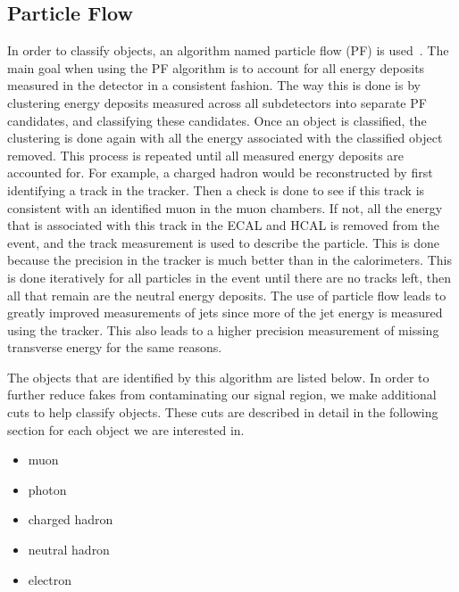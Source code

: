 \subsection{Particle Flow}
\label{subs:particleflow}
In order to classify objects, an algorithm named particle flow (PF) is used~\cite{pfReco}. 
The main goal when using the PF algorithm is to account for all energy deposits measured in the detector in a consistent fashion.
The way this is done is by clustering energy deposits measured across all subdetectors into separate PF candidates, and classifying these candidates.
Once an object is classified, the clustering is done again with all the energy associated with the classified object removed.
This process is repeated until all measured energy deposits are accounted for.
For example, a charged hadron would be reconstructed by first identifying a track in the tracker.
Then a check is done to see if this track is consistent with an identified muon in the muon chambers.
If not, all the energy that is associated with this track in the ECAL and HCAL is removed from the event,
and the track measurement is used to describe the particle.
This is done because the precision in the tracker is much better than in the calorimeters.
This is done iteratively for all particles in the event until there are no tracks left,
then all that remain are the neutral energy deposits.
The use of particle flow leads to greatly improved measurements of jets since more of the jet energy is measured using the tracker.
This also leads to a higher precision measurement of missing transverse energy for the same reasons.

The objects that are identified by this algorithm are listed below.
In order to further reduce fakes from contaminating our signal region, we make additional cuts to help classify objects.
These cuts are described in detail in the following section for each object we are interested in.

\begin{itemize}
\item muon          
\item photon        
\item charged hadron
\item neutral hadron
\item electron      
\end{itemize}


